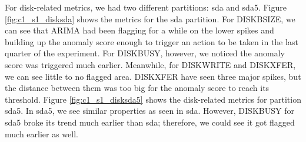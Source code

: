 \documentclass[pdflatex,sn-nature]{sn-jnl}%
\theoremstyle{thmstyleone}%
\theoremstyle{thmstyletwo}%
\theoremstyle{thmstylethree}%
\begin{document}
For disk-related metrics, we had two different partitions: sda and sda5. Figure \ref{fig:c1_s1_disksda} shows the metrics for the sda partition. For DISKBSIZE, we can see that ARIMA had been flagging for a while on the lower spikes and building up the anomaly score enough to trigger an action to be taken in the last quarter of the experiment. For DISKBUSY, however, we noticed the anomaly score was triggered much earlier. Meanwhile, for DISKWRITE and DISKXFER, we can see little to no flagged area. DISKXFER have seen three major spikes, but the distance between them was too big for the anomaly score to reach its threshold. Figure \ref{fig:c1_s1_disksda5} shows the disk-related metrics for partition sda5. In sda5, we see similar properties as seen in sda. However, DISKBUSY for sda5 broke its trend much earlier than sda; therefore, we could see it got flagged much earlier as well.
\end{document}
